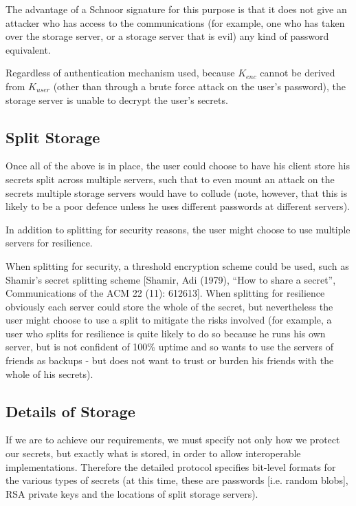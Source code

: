 \documentclass[a4paper,titlepage]{article}
\begin{document}
The advantage of a Schnoor signature for this purpose is that it does not
give an attacker who has access to the communications (for example,
one who has taken over the storage server, or a storage server that is
evil) any kind of password equivalent.

Regardless of authentication mechanism used, because $K_{enc}$ cannot
be derived from $K_{user}$ (other than through a brute force attack on
the user's password), the storage server is unable to decrypt the
user's secrets.

\subsection{Split Storage}

Once all of the above is in place, the user could choose to have his
client store his secrets split across multiple servers, such that to
even mount an attack on the secrets multiple storage servers would
have to collude (note, however, that this is likely to be a poor
defence unless he uses different passwords at different servers).

In addition to splitting for security reasons, the user might choose
to use multiple servers for resilience.

When splitting for security, a threshold encryption scheme could be
used, such as Shamir's secret splitting scheme [Shamir, Adi (1979),
  ``How to share a secret'', Communications of the ACM 22 (11):
  612613]. When splitting for resilience obviously each server could
store the whole of the secret, but nevertheless the user might choose
to use a split to mitigate the risks involved (for example, a user who
splits for resilience is quite likely to do so because he runs his own
server, but is not confident of 100\% uptime and so wants to use the
servers of friends as backups - but does not want to trust or burden
his friends with the whole of his secrets).

\subsection{Details of Storage}

If we are to achieve our requirements, we must specify not only how we
protect our secrets, but exactly what is stored, in order to allow
interoperable implementations. Therefore the detailed protocol
specifies bit-level formats for the various types of secrets (at this
time, these are passwords [i.e. random blobs], RSA private keys and
the locations of split storage servers).
\end{document}
